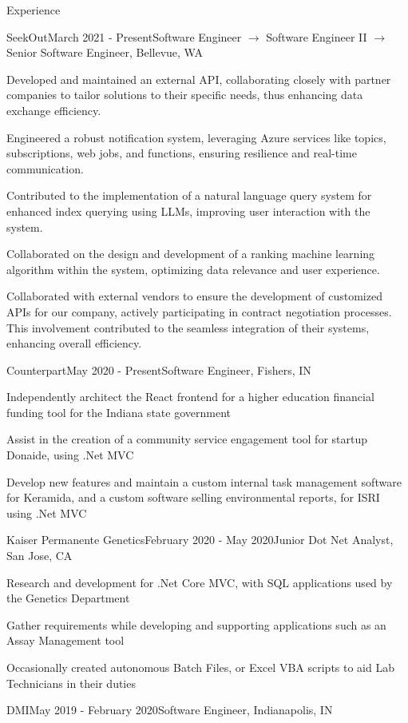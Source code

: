 \documentclass{resume} %
\begin{document}
\begin{rSection}{Experience}
    \begin{rSubsection}{SeekOut}{March 2021 - Present}{Software Engineer $\rightarrow$ Software Engineer 
 II $\rightarrow$ Senior Software Engineer, Bellevue, WA}
    
        \item Developed and maintained an external API, collaborating closely with partner companies to tailor solutions to their specific needs, thus enhancing data exchange efficiency.
        \item Engineered a robust notification system, leveraging Azure services like topics, subscriptions, web jobs, and functions, ensuring resilience and real-time communication.
        \item Contributed to the implementation of a natural language query system for enhanced index querying using LLMs, improving user interaction with the system.
        \item Collaborated on the design and development of a ranking machine learning algorithm within the system, optimizing data relevance and user experience.
        \item Collaborated with external vendors to ensure the development of customized APIs for our company, actively participating in contract negotiation processes. This involvement contributed to the seamless integration of their systems, enhancing overall efficiency.
        \end{rSubsection}
\begin{rSubsection}{Counterpart}{May 2020 - Present}{Software Engineer, Fishers, IN}

    \item Independently architect the React frontend for a higher education financial funding tool for the Indiana state government
    \item Assist in the creation of a community service engagement tool for startup Donaide, using .Net MVC
    \item Develop new features and maintain a custom internal task management software for Keramida, and a custom software selling environmental reports, for ISRI using .Net MVC
    \end{rSubsection}
\begin{rSubsection}{Kaiser Permanente Genetics}{February 2020 - May 2020}{Junior Dot Net Analyst, San Jose, CA}

\item Research and development for .Net Core MVC, with SQL applications used by the Genetics Department
\item Gather requirements while developing and supporting applications such as an Assay Management tool
\item Occasionally created autonomous Batch Files, or Excel VBA scripts to aid Lab Technicians in their duties
\end{rSubsection}
\begin{rSubsection}{DMI}{May 2019 - February 2020}{Software Engineer, Indianapolis, IN}


\end{rSubsection}
\end{rSection}
\end{document}
